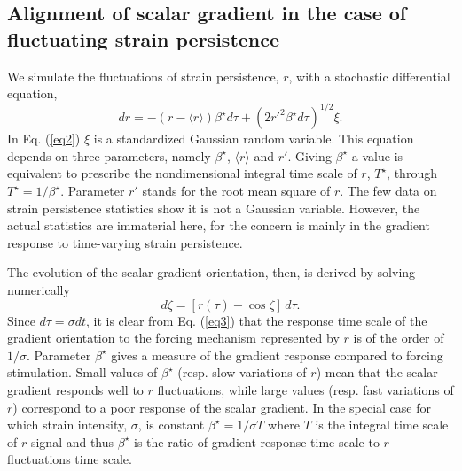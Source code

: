 \documentclass[doublespacing]{elsart}
\begin{document}
\subsection{Alignment of scalar gradient in the case of fluctuating
strain persistence}
\label{sec2.2}
We simulate 
the fluctuations of strain persistence, $ r $, with
a
stochastic differential equation,
\begin{equation}
\label{eq2}
dr =
- (r - \langle r \rangle) \beta^{\star} d \tau
+
{(2 r'^2 \beta^{\star} d \tau)}^{1/2} \xi.
\end{equation}
In Eq. (\ref{eq2}) $ \xi $ is a standardized Gaussian
random variable.
This equation depends on three parameters, namely
$ \beta^{\star} $, $ \langle r \rangle $ and $ r' $.
Giving $ \beta^{\star} $ a value is equivalent to
prescribe
the nondimensional integral time scale of $ r $, 
$ T^{\star} $, 
through
$ T^{\star} = 1/\beta^{\star} $.
Parameter 
$ r' $ stands for the root mean square of $ r $.
The
few data on strain persistence statistics
\cite{Lal99,Gal05}
show it is not a
Gaussian 
variable.
However, the actual statistics are immaterial here, for 
the concern is mainly in the gradient response
to time-varying strain persistence.

The evolution of the scalar gradient orientation, then,
is derived 
by solving numerically
\begin{equation}
\label{eq3}
d \zeta = [r(\tau) - \cos \zeta] \, d \tau.
\end{equation}
Since $ d \tau = \sigma dt $, 
it is clear 
from Eq. (\ref{eq3})
that
the response time scale of the gradient 
orientation
to the forcing mechanism 
represented by $ r $
is of the order of $ 1/\sigma $.
Parameter $ \beta^{\star} $ gives a measure of
the gradient response compared to forcing stimulation.
Small values of $ \beta^{\star} $
(resp. slow variations of $ r $)
mean that 
the scalar gradient
responds well to
$ r $ fluctuations, while large values 
(resp. fast variations of $ r $) correspond to a 
poor
response
of the scalar gradient.
In the special case for which strain intensity, $ \sigma $, is constant
$ \beta^{\star} = 1/\sigma T $ 
where $ T $ is the integral time scale of $ r $ signal
and thus $ \beta^{\star} $ is the ratio of gradient response time scale
to $ r $ fluctuations time scale.
\end{document}
